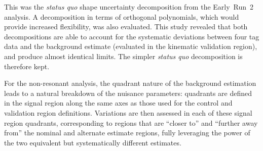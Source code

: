This was the \emph{status quo} shape uncertainty decomposition from the
Early~Run~2 analysis. A decomposition in terms of orthogonal polynomials, which
would provide increased flexibility, was also evaluated. This study revealed
that both decompositions are able to account for the systematic deviations
between four tag data and the background estimate (evaluated in the kinematic
validation region), and produce almost identical limits. The simpler \emph{status quo} decomposition 
is therefore kept.

For the non-resonant analysis, the quadrant nature of the background estimation
leads to a natural breakdown of the nuisance parameters: quadrants are defined 
in the signal region along the same axes as those used for the control and validation 
region definitions. Variations are then assessed in each of these signal region quadrants,
corresponding to regions that are ``closer to'' and ``further away from'' the 
nominal and alternate estimate regions, fully leveraging the power of the two
equivalent but systematically different estimates.

